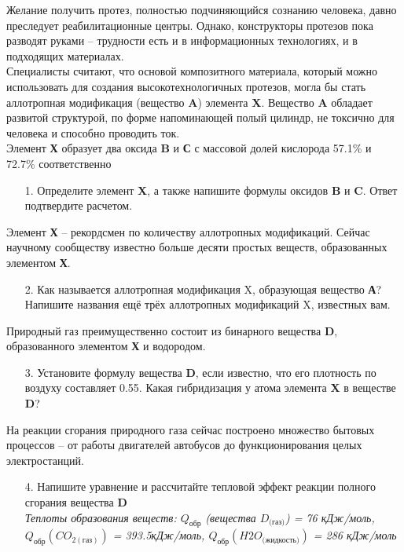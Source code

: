 Желание получить протез, полностью подчиняющийся сознанию человека, давно преследует реабилитационные центры. Однако, конструкторы протезов пока разводят руками – трудности есть и в информационных технологиях, и в подходящих материалах. \\
Специалисты считают, что основой композитного материала, который можно использовать для создания высокотехнологичных протезов, могла бы стать аллотропная модификация (вещество \textbf{A}) элемента \textbf{X}. Вещество \textbf{A} обладает развитой структурой, по форме напоминающей полый цилиндр, не токсично для человека и способно проводить ток.\\
Элемент \textbf{Х} образует два оксида \textbf{B} и \textbf{С} с массовой долей кислорода 57.1\% и 72.7\% соответственно
\begin{enumerate}
\item[1.] Определите элемент \textbf{X}, а также напишите формулы оксидов \textbf{B} и \textbf{C}. Ответ подтвердите расчетом.
\end{enumerate}
Элемент \textbf{Х} – рекордсмен по количеству аллотропных модификаций. Сейчас научному сообществу известно больше десяти простых веществ, образованных элементом \textbf{Х}. 
\begin{enumerate}
\item[2.] Как называется аллотропная модификация X, образующая вещество \textbf{А}? Напишите названия ещё трёх аллотропных модификаций X, известных вам.
\end{enumerate}
Природный газ преимущественно состоит из бинарного вещества \textbf{D}, образованного элементом \textbf{Х} и водородом.
\begin{enumerate}
\item[3.] Установите формулу вещества \textbf{D}, если известно, что его плотность по воздуху составляет 0.55. Какая гибридизация у атома элемента \textbf{X} в веществе \textbf{D}?
\end{enumerate}
На реакции сгорания природного газа сейчас построено множество бытовых процессов – от работы двигателей автобусов до функционирования целых электростанций. 
\begin{enumerate}
\item[4.] Напишите уравнение и рассчитайте тепловой эффект реакции полного сгорания вещества \textbf{D}\\
\textit{Теплоты образования веществ: $Q_\text{обр}$ (вещества $D_\text{(газ)}$) = 76 кДж/моль,\\ $Q_\text{обр}(CO_{2(\text{газ})})$ = 393.5кДж/моль, $Q_\text{обр} (H2O_\text{(жидкость)})$ =  286 кДж/моль}
\end{enumerate}

